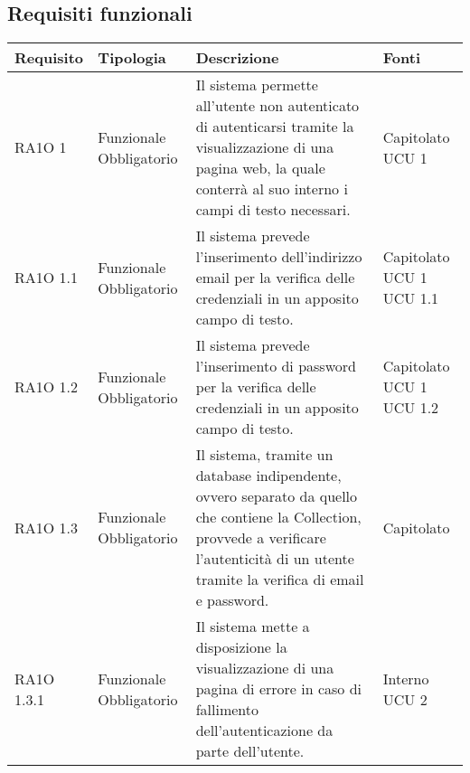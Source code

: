 \subsection{Requisiti funzionali }

			\begin{center}
			\bgroup
			\def\arraystretch{1.8}
			\begin{longtable}{ | l | p{2cm} | p{5cm} | p{1.7cm} |}
		
			\cellcolor[gray]{0.9} \textbf{Requisito} & \cellcolor[gray]{0.9} \textbf{Tipologia} 
			& \cellcolor[gray]{0.9} \textbf{Descrizione} & \cellcolor[gray]{0.9} \textbf{Fonti} \\ \hline
      
				RA1O 1 & Funzionale \newline  Obbligatorio  & Il sistema permette all'utente non autenticato di autenticarsi tramite la visualizzazione di una pagina web, la quale conterrà al suo interno i campi di testo necessari. &  Capitolato \newline  UCU 1 \newline  \\ \hline      
				RA1O 1.1 & Funzionale \newline  Obbligatorio  & Il sistema prevede l'inserimento dell'indirizzo email per la verifica delle credenziali in un apposito campo di testo. &  Capitolato \newline  UCU 1 \newline  UCU 1.1 \newline  \\ \hline      
				RA1O 1.2 & Funzionale \newline  Obbligatorio  & Il sistema prevede l'inserimento di password per la verifica delle credenziali in un apposito campo di testo. &  Capitolato \newline  UCU 1 \newline  UCU 1.2 \newline  \\ \hline      
				RA1O 1.3 & Funzionale \newline  Obbligatorio  & Il sistema, tramite un database indipendente, ovvero separato da quello che contiene la Collection, provvede a verificare l'autenticità  di un utente tramite la verifica di email e password. &  Capitolato \newline  \\ \hline      
				RA1O 1.3.1 & Funzionale \newline  Obbligatorio  & Il sistema mette a disposizione la visualizzazione di una pagina di errore in caso di fallimento dell'autenticazione da parte dell'utente. &  Interno \newline  UCU 2 \newline  \\ \hline      

\end{longtable}
\end{center}
